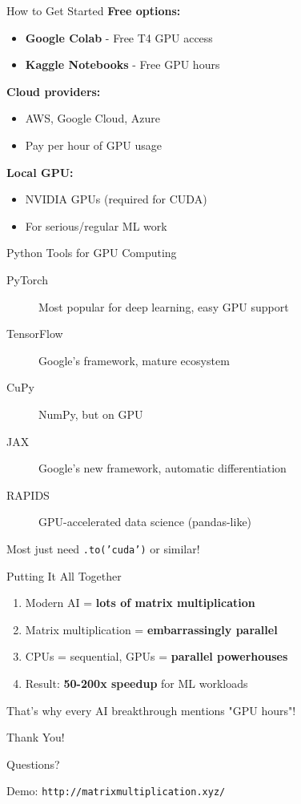 \documentclass[10pt]{beamer}
\begin{document}
\begin{frame}{How to Get Started}
  \textbf{Free options:}
  \begin{itemize}
    \item \textbf{Google Colab} - Free T4 GPU access
    \item \textbf{Kaggle Notebooks} - Free GPU hours
  \end{itemize}
  
  \vspace{1em}
  \textbf{Cloud providers:}
  \begin{itemize}
    \item AWS, Google Cloud, Azure
    \item Pay per hour of GPU usage
  \end{itemize}
  
  \vspace{1em}
  \textbf{Local GPU:}
  \begin{itemize}
    \item NVIDIA GPUs (required for CUDA)
    \item For serious/regular ML work
  \end{itemize}
\end{frame}

\begin{frame}{Python Tools for GPU Computing}
  \begin{description}
    \item[PyTorch] Most popular for deep learning, easy GPU support
    \item[TensorFlow] Google's framework, mature ecosystem
    \item[CuPy] NumPy, but on GPU
    \item[JAX] Google's new framework, automatic differentiation
    \item[RAPIDS] GPU-accelerated data science (pandas-like)
  \end{description}
  
  \vspace{1em}
  \centering
  \small Most just need \texttt{.to('cuda')} or similar!
\end{frame}

\begin{frame}{Putting It All Together}
  \begin{enumerate}
    \item Modern AI = \textbf{lots of matrix multiplication}
    \item Matrix multiplication = \textbf{embarrassingly parallel}
    \item CPUs = sequential, GPUs = \textbf{parallel powerhouses}
    \item Result: \textbf{50-200x speedup} for ML workloads
  \end{enumerate}
  
  \vspace{2em}
  \centering
  \Large That's why every AI breakthrough mentions "GPU hours"!
\end{frame}

\begin{frame}[standout]
  \Huge Thank You!
  
  \vspace{2em}
  \Large Questions?
  
  \vspace{2em}
  \normalsize
  Demo: \texttt{http://matrixmultiplication.xyz/}
\end{frame}
\end{document}
